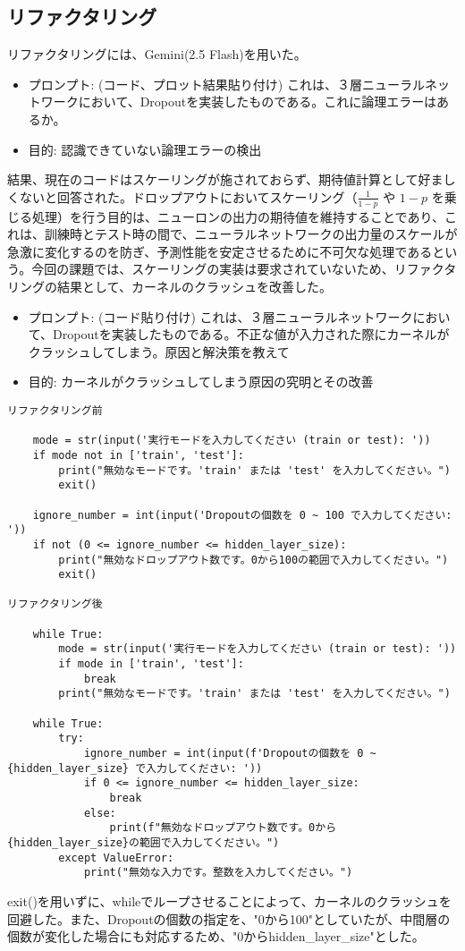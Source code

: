 \documentclass[11px,a4,dvipdfmx]{jsarticle}
\begin{document}
\subsection{リファクタリング}
リファクタリングには、Gemini(2.5 Flash)を用いた。
\begin{itemize}
    \item プロンプト: (コード、プロット結果貼り付け)  これは、３層ニューラルネットワークにおいて、Dropoutを実装したものである。これに論理エラーはあるか。
    \item 目的: 認識できていない論理エラーの検出
\end{itemize}
結果、現在のコードはスケーリングが施されておらず、期待値計算として好ましくないと回答された。ドロップアウトにおいてスケーリング（$\frac{1}{1-p}$ や $1-p$ を乗じる処理）を行う目的は、ニューロンの出力の期待値を維持することであり、これは、訓練時とテスト時の間で、ニューラルネットワークの出力量のスケールが急激に変化するのを防ぎ、予測性能を安定させるために不可欠な処理であるという。今回の課題では、スケーリングの実装は要求されていないため、リファクタリングの結果として、カーネルのクラッシュを改善した。
\begin{itemize}
    \item プロンプト: (コード貼り付け)  これは、３層ニューラルネットワークにおいて、Dropoutを実装したものである。不正な値が入力された際にカーネルがクラッシュしてしまう。原因と解決策を教えて
    \item 目的: カーネルがクラッシュしてしまう原因の究明とその改善
\end{itemize}
\begin{verbatim}
リファクタリング前

    mode = str(input('実行モードを入力してください (train or test): '))
    if mode not in ['train', 'test']:
        print("無効なモードです。'train' または 'test' を入力してください。")
        exit()

    ignore_number = int(input('Dropoutの個数を 0 ~ 100 で入力してください: '))
    if not (0 <= ignore_number <= hidden_layer_size):
        print("無効なドロップアウト数です。0から100の範囲で入力してください。")
        exit()

リファクタリング後

    while True:
        mode = str(input('実行モードを入力してください (train or test): '))
        if mode in ['train', 'test']:
            break
        print("無効なモードです。'train' または 'test' を入力してください。")

    while True:
        try:
            ignore_number = int(input(f'Dropoutの個数を 0 ~ {hidden_layer_size} で入力してください: '))
            if 0 <= ignore_number <= hidden_layer_size:
                break
            else:
                print(f"無効なドロップアウト数です。0から{hidden_layer_size}の範囲で入力してください。")
        except ValueError:
            print("無効な入力です。整数を入力してください。")
\end{verbatim}
exit()を用いずに、whileでループさせることによって、カーネルのクラッシュを回避した。また、Dropoutの個数の指定を、"0から100"としていたが、中間層の個数が変化した場合にも対応するため、"0からhidden\_layer\_size"とした。
\end{document}
